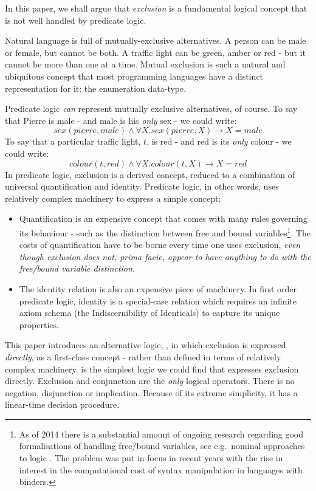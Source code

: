 In this paper, we shall argue that \emph{exclusion} is a fundamental logical concept that is not well handled by predicate logic.

Natural language is full of mutually-exclusive alternatives.
A person can be male or female, but cannot be both.
A traffic light can be green, amber or red - but it cannot be more than one at a time.
Mutual exclusion is such a natural and ubiquitous concept that most programming languages have a distinct representation for it: the enumeration data-type.

Predicate logic \emph{can} represent mutually exclusive alternatives, of course.
To say that Pierre is male - and male is his \emph{only} sex - we could write:
\[
sex(pierre, male) \land \forall X . sex(pierre, X) \rightarrow X = male
\]
To say that a particular traffic light, $t$, is red - and red is its \emph{only} colour - we could write:
\[
colour(t, red) \land \forall X . colour(t, X) \rightarrow X = red
\]
In predicate logic, exclusion is a derived concept, reduced to a combination of universal quantification and identity.
Predicate logic, in other words, uses relatively complex machinery to express a simple concept:
\begin{itemize}
\item Quantification is an expensive concept that comes with
      many rules governing its behaviour - such as the distinction
      between free and bound variables\footnote{As of 2014 there is a substantial amount
      of ongoing research regarding good formalisations of handling
      free/bound variables, see e.g.~nominal approaches to
      logic \cite{PittsAM:newaas,PittsAM:nomsetnasics}. The problem
      was put in focus in recent years with the rise in interest in the
      computational cost of syntax manipulation in languages with
      binders.}. The costs of quantification have to be
      borne every time one uses exclusion, \emph{even though exclusion does
      not, prima facie, appear to have anything to do with the
      free/bound variable distinction}.
\item The identity relation is also an expensive piece of machinery. In first order predicate logic, identity is a special-case relation which requires an infinite axiom schema (the Indiscernibility of Identicals) to capture its unique properties.
\end{itemize}

This paper introduces an alternative logic, \ELFULL{}, in which exclusion is expressed \emph{directly}, as a first-class concept - rather than defined in terms of relatively complex machinery.
\ELFULL{} is the simplest logic we could find that expresses exclusion directly. 
Exclusion and conjunction are the \emph{only} logical operators. 
There is no negation, disjunction or implication.
Because of its extreme simplicity, it has a linear-time decision procedure.


